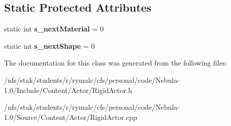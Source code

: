 \subsection*{Static Protected Attributes}
\begin{DoxyCompactItemize}
\item 
\hypertarget{classRigidActor_a05767ac359f7a3227c2018c1690a132a}{
static int {\bfseries s\_\-nextMaterial} = 0}
\label{classRigidActor_a05767ac359f7a3227c2018c1690a132a}

\item 
\hypertarget{classRigidActor_a622647045dd53a27e07eb058d53fe615}{
static int {\bfseries s\_\-nextShape} = 0}
\label{classRigidActor_a622647045dd53a27e07eb058d53fe615}

\end{DoxyCompactItemize}


The documentation for this class was generated from the following files:\begin{DoxyCompactItemize}
\item 
/nfs/stak/students/r/rymalc/cfs/personal/code/Nebula-\/1.0/Include/Content/Actor/RigidActor.h\item 
/nfs/stak/students/r/rymalc/cfs/personal/code/Nebula-\/1.0/Source/Content/Actor/RigidActor.cpp\end{DoxyCompactItemize}
